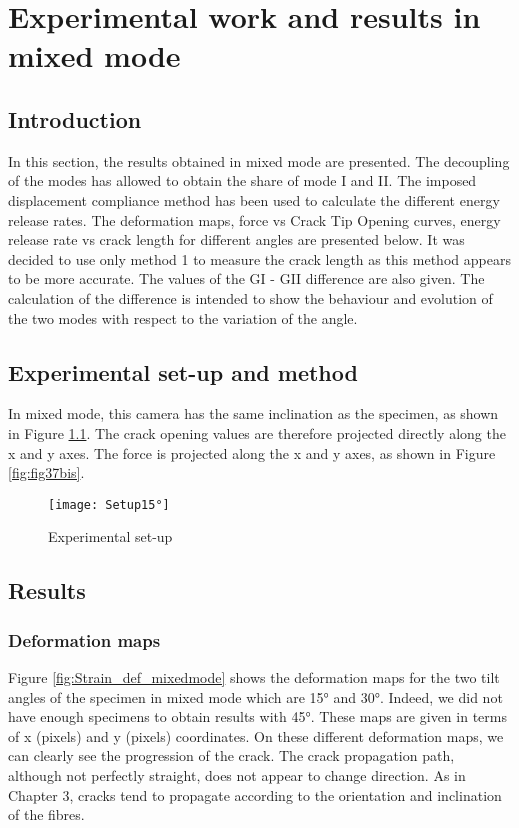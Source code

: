 \chapter{Experimental work and results in mixed mode}
\label{Chapter2}

\section{Introduction}

In this section, the results obtained in mixed mode are presented. The decoupling of the modes has allowed to obtain the share of mode I and II. The imposed displacement compliance method has been used to calculate the different energy release rates. The deformation maps, force vs Crack Tip Opening curves, energy release rate vs crack length for different angles are presented below. It was decided to use only method 1 to measure the crack length as this method appears to be more accurate. The values of the GI - GII difference are also given. The calculation of the difference is intended to show the behaviour and evolution of the two modes with respect to the variation of the angle.

\section{Experimental set-up and method}

In mixed mode, this camera has the same inclination as the specimen, as shown in Figure \ref{fig:Setup15°}. The crack opening values are therefore projected directly along the x and y axes. The force is projected along the x and y axes, as shown in Figure \ref{fig:fig37bis}.

\begin{figure}[htp]
	\centering
	\texttt{[image: Setup15°]}
	\caption{Experimental set-up}
	\label{fig:Setup15°}
\end{figure}

\section{Results}

\subsection{Deformation maps}

Figure \ref{fig:Strain_def_mixedmode} shows the deformation maps for the two tilt angles of the specimen in mixed mode which are 15° and 30°. Indeed, we did not have enough specimens to obtain results with 45°. These maps are given in terms of x (pixels) and y (pixels) coordinates. On these different deformation maps, we can clearly see the progression of the crack. The crack propagation path, although not perfectly straight, does not appear to change direction. As in Chapter 3, cracks tend to propagate according to the orientation and inclination of the fibres.

